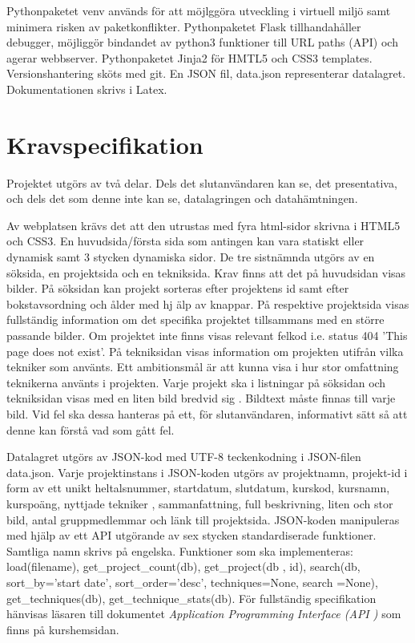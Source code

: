 \documentclass{TDP003mall}
\begin{document}
Pythonpaketet venv används för att möjlggöra utveckling i virtuell miljö samt minimera risken av paketkonflikter.
Pythonpaketet Flask tillhandahåller debugger, möjliggör bindandet av python3 funktioner till URL paths (API) och agerar webbserver.
Pythonpaketet Jinja2 för HMTL5 och CSS3 templates.
Versionshantering sköts med git.
En JSON fil, data.json representerar datalagret.
Dokumentationen skrivs i Latex.

\newpage

\section{Kravspecifikation}
Projektet utgörs av två delar. Dels det slutanvändaren kan se, det presentativa,
och dels det som denne inte kan se, datalagringen och datahämtningen.

Av webplatsen krävs det att den utrustas med fyra html-sidor skrivna i HTML5 och
 CSS3. En huvudsida/första sida som antingen kan vara statiskt eller dynamisk samt
 3 stycken dynamiska sidor. De tre sistnämnda utgörs av en söksida, en projektsida
 och en tekniksida. Krav finns att det på huvudsidan visas bilder. På söksidan kan
 projekt sorteras efter projektens id samt efter bokstavsordning och ålder med hj
älp av knappar. På respektive projektsida visas fullständig information om det specifika
 projektet tillsammans med en större passande bilder. Om projektet inte finns visas
 relevant felkod i.e. status 404 'This page does not exist'. På tekniksidan visas
 information om projekten utifrån vilka tekniker som använts. Ett ambitionsmål är
 att kunna visa i hur stor omfattning teknikerna använts i projekten. Varje projekt
 ska i listningar på söksidan och tekniksidan visas med en liten bild bredvid sig
. Bildtext måste finnas till varje bild. Vid fel ska dessa hanteras på ett, för 
slutanvändaren, informativt sätt så att denne kan förstå vad som gått fel.

Datalagret utgörs av JSON-kod med UTF-8 teckenkodning i JSON-filen data.json. Varje
 projektinstans i JSON-koden utgörs av projektnamn, projekt-id i form av ett unikt
 heltalsnummer, startdatum, slutdatum, kurskod, kursnamn, kurspoäng, nyttjade tekniker
, sammanfattning, full beskrivning, liten och stor bild, antal gruppmedlemmar och
 länk till projektsida. JSON-koden manipuleras med hjälp av ett API utgörande av
 sex stycken standardiserade funktioner. Samtliga namn skrivs på engelska. Funktioner
 som ska implementeras: load(filename), get\_project\_count(db), get\_project(db
, id), search(db, sort\_by='start date', sort\_order='desc', techniques=None, search
=None), get\_techniques(db), get\_technique\_stats(db). För fullständig specifikation
 hänvisas läsaren till dokumentet \textit{Application Programming Interface (API
)} som finns på kurshemsidan.
\end{document}
